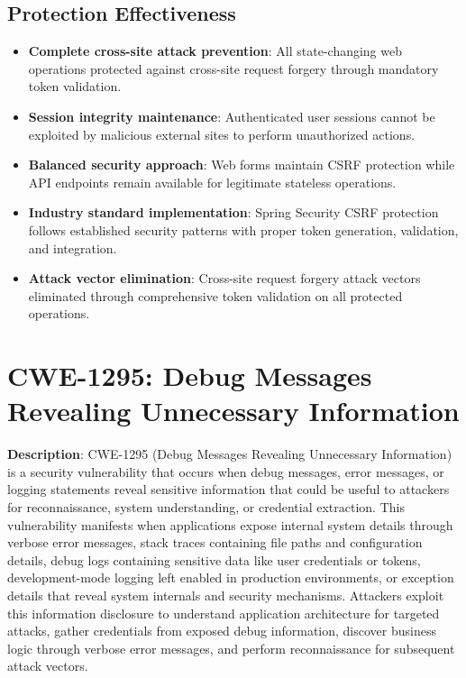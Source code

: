 \documentclass[]{UCD_CS_FYP_Report}
\begin{document}
\subsection{Protection Effectiveness}
\begin{itemize}
	\item \textbf{Complete cross-site attack prevention}: All state-changing web operations protected against cross-site request forgery through mandatory token validation.
	\item \textbf{Session integrity maintenance}: Authenticated user sessions cannot be exploited by malicious external sites to perform unauthorized actions.
	\item \textbf{Balanced security approach}: Web forms maintain CSRF protection while API endpoints remain available for legitimate stateless operations.
	\item \textbf{Industry standard implementation}: Spring Security CSRF protection follows established security patterns with proper token generation, validation, and integration.
	\item \textbf{Attack vector elimination}: Cross-site request forgery attack vectors eliminated through comprehensive token validation on all protected operations.
\end{itemize}

\section{CWE-1295: Debug Messages Revealing Unnecessary Information}

\textbf{Description}: CWE-1295 (Debug Messages Revealing Unnecessary Information) is a security vulnerability that occurs when debug messages, error messages, or logging statements reveal sensitive information that could be useful to attackers for reconnaissance, system understanding, or credential extraction. This vulnerability manifests when applications expose internal system details through verbose error messages, stack traces containing file paths and configuration details, debug logs containing sensitive data like user credentials or tokens, development-mode logging left enabled in production environments, or exception details that reveal system internals and security mechanisms. Attackers exploit this information disclosure to understand application architecture for targeted attacks, gather credentials from exposed debug information, discover business logic through verbose error messages, and perform reconnaissance for subsequent attack vectors.
\end{document}
